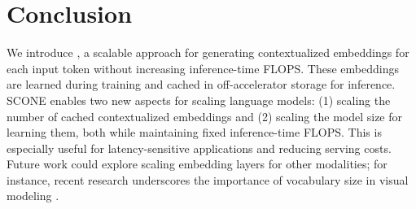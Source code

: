 \section{Conclusion}\label{sec:conclusion}

We introduce \SCONE, a scalable approach for generating  contextualized embeddings for each input token without increasing inference-time FLOPS. These embeddings are learned during training and cached in off-accelerator storage for inference. SCONE enables two new aspects for scaling language models: (1) scaling the number of cached contextualized embeddings and (2) scaling the model size for learning them, both while maintaining fixed inference-time FLOPS. This is especially useful for latency-sensitive applications \citep{jones2021scaling,snell2024scaling} and reducing serving costs. Future work could explore scaling embedding layers for other modalities; for instance, recent research underscores the importance of vocabulary size in visual modeling \citep{yu2023language}.